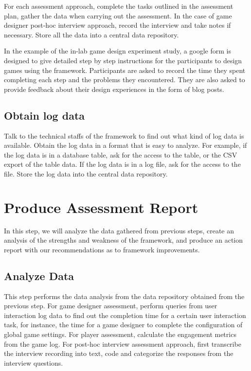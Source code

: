 For each assessment approach, complete the tasks outlined in the assessment plan, gather the data when carrying out the 
assessment. In the case of game designer post-hoc interview approach, record the interview and take notes if necessary. 
Store all the data into a central data repository. 

In the example of the in-lab game design experiment study, a google form is designed to give detailed step by step 
instructions for the participants to design games using the framework. Participants are asked to record the time they spent completing 
each step and the problems they encountered. They are also asked to provide feedback about their design experiences
in the form of blog posts. 

\subsection{Obtain log data}

Talk to the technical staffs of the framework to find out what kind of log data is available. Obtain the log data in a format that 
is easy to analyze. For example, if the log data is in a database table, ask for the access to the table, or the CSV export of 
the table data. If the log data is in a log file, ask for the access to the file. Store the log data into the central data repository.

\section{Produce Assessment Report}

In this step, we will analyze the data gathered from previous steps,
create an analysis of the strengths and weakness of the framework, 
and produce an action report with our recommendations as to framework improvements.

\subsection{Analyze Data}

This step performs the data analysis from the data repository obtained from the previous step. For game designer assessment, 
perform queries from user interaction log data to find out the completion time for a certain user interaction task, for instance, the 
time for a game designer to complete the configuration of global game settings. For player assessment, calculate the 
engagement metrics from the game log. For post-hoc interview assessment approach, first transcribe the interview recording into 
text, code and categorize the responses from the interview questions. 

